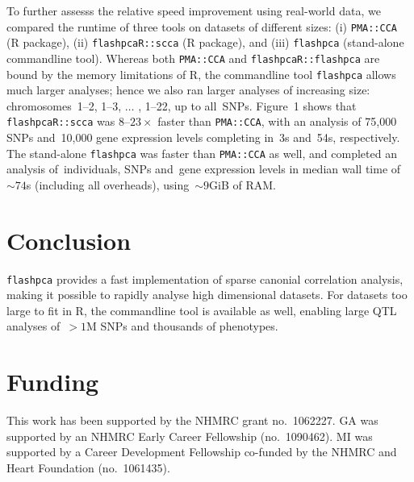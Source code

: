 \documentclass{bioinfo}
\begin{document}
To further assesss the relative speed improvement using real-world data,
we compared the runtime of three tools on datasets of different sizes:
(i) \texttt{PMA::CCA} (\textsf{R} package), (ii) \texttt{flashpcaR::scca}
(\textsf{R} package), and (iii) \texttt{flashpca} (stand-alone commandline
tool).  Whereas both \texttt{PMA::CCA} and \texttt{flashpcaR::flashpca}
are bound by the memory limitations of \textsf{R}, the commandline
tool \texttt{flashpca} allows much larger analyses; hence we also ran
larger analyses of increasing size: chromosomes~1--2, 1--3, $\hdots$
, 1--22, up to all~\nsnps SNPs.  Figure~1\vphantom{\ref{fig:01}}
shows that \texttt{flashpcaR::scca} was $8\text{--}23\times$ faster
than \texttt{PMA::CCA}, with an analysis of 75,000 SNPs and~10,000 gene
expression levels completing in~3s and~54s, respectively.  The stand-alone
\texttt{flashpca} was faster than \texttt{PMA::CCA} as well, and completed
an analysis of~\nindiv individuals, \nsnps SNPs and~\ngenes gene expression
levels in median wall time of ${\sim}74$s (including all overheads),
using~${\sim}9$GiB of RAM.\vspace*{-12pt}

\section{Conclusion}

\texttt{flashpca} provides a fast implementation of sparse canonial correlation
analysis, making it possible to rapidly analyse high dimensional datasets.
For datasets too large to fit in \textsf{R}, the commandline tool is
available as well, enabling large QTL analyses of~${>}1$M SNPs and thousands
of phenotypes.\vspace*{-12pt}

\section*{Funding}

This work has been supported by the NHMRC grant no.~1062227. GA was supported
by an NHMRC Early Career Fellowship (no.~1090462). MI was supported by a
Career Development Fellowship co-funded by the NHMRC and Heart Foundation
(no.~1061435).\vspace*{-12pt}




%
%
%
%
%
%
%
\end{document}
